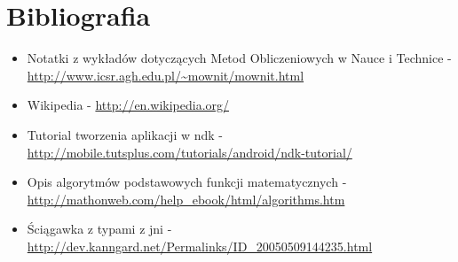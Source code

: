 \documentclass[a4paper,12pt]{article}
\begin{document}
\section{Bibliografia}
\begin{itemize}
\item Notatki z wykładów dotyczących Metod Obliczeniowych w Nauce i Technice - \url{http://www.icsr.agh.edu.pl/~mownit/mownit.html}
\item Wikipedia - \url{http://en.wikipedia.org/}
\item Tutorial tworzenia aplikacji w ndk - \url{http://mobile.tutsplus.com/tutorials/android/ndk-tutorial/}
\item Opis algorytmów podstawowych funkcji matematycznych - \url{http://mathonweb.com/help_ebook/html/algorithms.htm}
\item Ściągawka z typami z jni - \url{http://dev.kanngard.net/Permalinks/ID_20050509144235.html} 
\end{itemize}
\end{document}
